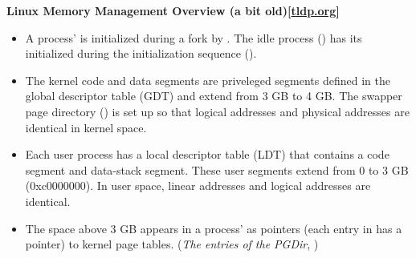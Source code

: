 \textbf{Linux Memory Management Overview (a bit
  old)[\href{http://tldp.org/LDP/khg/HyperNews/get/memory/linuxmm.html}{tldp.org}]}
\begin{itemize}
\item A process'  is initialized during a fork by
  . The idle process () has its 
  initialized during the initialization sequence ().
\item The kernel code and data segments are priveleged segments defined in the global
  descriptor table (GDT) and extend from 3 GB to 4 GB. The swapper page directory
  () is set up so that logical addresses and physical addresses are
  identical in kernel space.
\item Each user process has a local descriptor table (LDT) that contains a code segment and
  data-stack segment. These user segments extend from 0 to 3 GB (0xc0000000). In user
  space, linear addresses and logical addresses are identical.
\item The space above 3 GB appears in a process'  as pointers (each entry in
   has a pointer) to kernel page tables. (\emph{The entries of the
    PGDir}, \cite[Sec 2.5.4]{bovet2005understanding})


\end{itemize}
